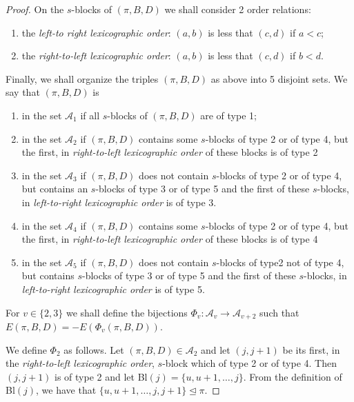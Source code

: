 \documentclass{amsart}
\begin{document}
\begin{proof}
    On the $s$-blocks of $(\pi, B, D)$ we shall consider 2 order relations: 
    \begin{enumerate}
    	\item[(i)] the \emph{left-to right lexicographic order}: $(a, b) $ is less that $(c, d)$ if $ a < c $;
    	\item[(ii)] the \emph{right-to-left lexicographic order}: $ (a, b) $ is less that $(c, d)$ if $ b < d $.
    \end{enumerate}
    
    Finally, we shall organize the triples $(\pi, B, D)$ as above into 5 disjoint sets. We say that $(\pi, B, D)$ is
    \begin{enumerate}
    	\item[$\bullet$] in the set $\mathcal{A}_1$ if all $s$-blocks of $(\pi, B, D)$ are of type 1;
    	\item[$\bullet$] in the set $\mathcal{A}_2$ if 
    	$(\pi, B, D)$ contains some $s$-blocks of type 2 or of type 4, but the first, in \emph{right-to-left lexicographic order} of these blocks is of type 2
    	\item[$\bullet$] in the set $\mathcal{A}_3$ if
    	$(\pi, B, D)$ does not contain $s$-blocks of type 2 or of type 4, but contains an $s$-blocks of type 3 or of type 5 and the first of these $s$-blocks, in \emph{left-to-right lexicographic order} is of type 3.
    	\item[$\bullet$] in the set $\mathcal{A}_4 $ if 
    	$(\pi, B, D)$ contains some $s$-blocks of type 2 or of type 4, but the first, in \emph{right-to-left lexicographic order} of these blocks is of type 4
    	\item[$\bullet$] in the set $\mathcal{A}_5$ if
    	$(\pi, B, D)$ does not contain $s$-blocks of type2 not of type 4, but contains $s$-blocks of type 3 or of type 5 and the first of these $s$-blocks, in \emph{left-to-right lexicographic order} is of type 5.
    \end{enumerate}

  For $ v \in\{2, 3\}$ we shall define the bijections 
  $ \Phi_v:\mathcal{A}_v \rightarrow \mathcal{A}_{v+2}$
  such that
  $ E(\pi, B, D) = - E(\Phi_v(\pi, B, D))$.
  
  We define $\Phi_2$ as follows. Let $(\pi, B, D) \in \mathcal{A}_2 $ and let $ (j, j+1)$ be its first, in the \emph{right-to-left lexicographic order}, $s$-block
  which of type 2 or of type 4. Then $(j, j+1)$ is of type 2 and let \textrm{Bl}$(j)= \{ u, u+1, \dots, j\}$. From the definition of \textrm{Bl}$(j)$, we have that $\{ u, u+1, \dots,j, j+1\} \trianglelefteq \pi$.
  

\end{proof}
\end{document}
